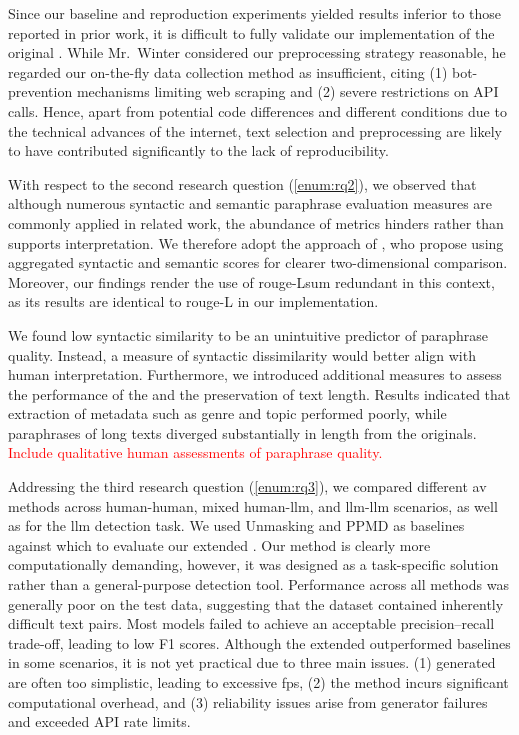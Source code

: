 Since our baseline and reproduction experiments yielded results inferior to those reported in prior work, it is difficult to fully validate our implementation of the original \impAppr{}. 
While Mr.~Winter considered our preprocessing strategy reasonable, he regarded our on-the-fly data collection method as insufficient, citing (1) bot-prevention mechanisms limiting web scraping and (2) severe restrictions on API calls. 
Hence, apart from potential code differences and different conditions due to the technical advances of the internet, text selection and preprocessing are likely to have contributed significantly to the lack of reproducibility.

With respect to the second research question (\autoref{enum:rq2}), we observed that although numerous syntactic and semantic paraphrase evaluation measures are commonly applied in related work, the abundance of metrics hinders rather than supports interpretation. 
We therefore adopt the approach of \citet{gohsen_captions_2023}, who propose using aggregated syntactic and semantic scores for clearer two-dimensional comparison. 
Moreover, our findings render the use of \ac{rouge}-Lsum redundant in this context, as its results are identical to \ac{rouge}-L in our implementation. 

We found low syntactic similarity to be an unintuitive predictor of paraphrase quality. 
Instead, a measure of syntactic dissimilarity would better align with human interpretation. 
Furthermore, we introduced additional measures to assess the performance of the \pextractor{} and the preservation of text length. 
Results indicated that extraction of metadata such as genre and topic performed poorly, while paraphrases of long \dataGutenberg{} texts diverged substantially in length from the originals. 
\textcolor{red}{Include qualitative human assessments of paraphrase quality.}

Addressing the third research question (\autoref{enum:rq3}), we compared different \ac{av} methods across human-human, mixed human-\ac{llm}, and \ac{llm}-\ac{llm} scenarios, as well as for the \ac{llm} detection task. 
We used Unmasking and PPMD as baselines against which to evaluate our extended \impAppr{}. 
Our method is clearly more computationally demanding, however, it was designed as a task-specific solution rather than a general-purpose detection tool. 
Performance across all methods was generally poor on the test data, suggesting that the dataset contained inherently difficult text pairs. 
Most models failed to achieve an acceptable precision–recall trade-off, leading to low F1 scores. 
Although the extended \impAppr{} outperformed baselines in some scenarios, it is not yet practical due to three main issues. 
(1) generated \imps{} are often too simplistic, leading to excessive \acp{fp}, 
(2) the method incurs significant computational overhead, and 
(3) reliability issues arise from generator failures and exceeded API rate limits.

